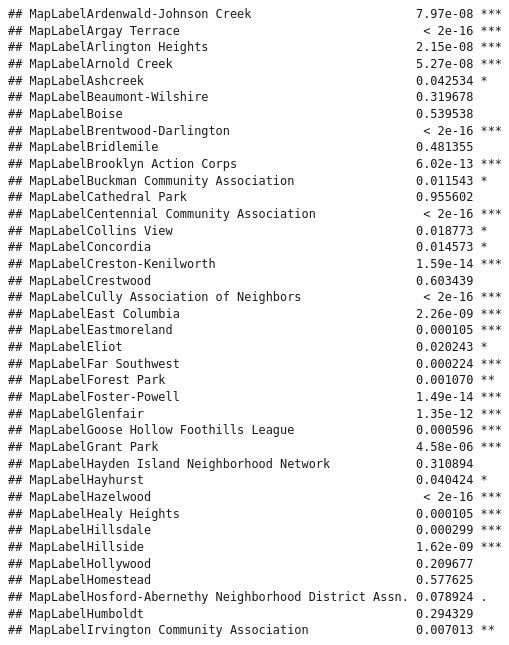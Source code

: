 \documentclass[]{article}
\begin{document}
\begin{verbatim}
## MapLabelArdenwald-Johnson Creek                       7.97e-08 ***
## MapLabelArgay Terrace                                  < 2e-16 ***
## MapLabelArlington Heights                             2.15e-08 ***
## MapLabelArnold Creek                                  5.27e-08 ***
## MapLabelAshcreek                                      0.042534 *  
## MapLabelBeaumont-Wilshire                             0.319678    
## MapLabelBoise                                         0.539538    
## MapLabelBrentwood-Darlington                           < 2e-16 ***
## MapLabelBridlemile                                    0.481355    
## MapLabelBrooklyn Action Corps                         6.02e-13 ***
## MapLabelBuckman Community Association                 0.011543 *  
## MapLabelCathedral Park                                0.955602    
## MapLabelCentennial Community Association               < 2e-16 ***
## MapLabelCollins View                                  0.018773 *  
## MapLabelConcordia                                     0.014573 *  
## MapLabelCreston-Kenilworth                            1.59e-14 ***
## MapLabelCrestwood                                     0.603439    
## MapLabelCully Association of Neighbors                 < 2e-16 ***
## MapLabelEast Columbia                                 2.26e-09 ***
## MapLabelEastmoreland                                  0.000105 ***
## MapLabelEliot                                         0.020243 *  
## MapLabelFar Southwest                                 0.000224 ***
## MapLabelForest Park                                   0.001070 ** 
## MapLabelFoster-Powell                                 1.49e-14 ***
## MapLabelGlenfair                                      1.35e-12 ***
## MapLabelGoose Hollow Foothills League                 0.000596 ***
## MapLabelGrant Park                                    4.58e-06 ***
## MapLabelHayden Island Neighborhood Network            0.310894    
## MapLabelHayhurst                                      0.040424 *  
## MapLabelHazelwood                                      < 2e-16 ***
## MapLabelHealy Heights                                 0.000105 ***
## MapLabelHillsdale                                     0.000299 ***
## MapLabelHillside                                      1.62e-09 ***
## MapLabelHollywood                                     0.209677    
## MapLabelHomestead                                     0.577625    
## MapLabelHosford-Abernethy Neighborhood District Assn. 0.078924 .  
## MapLabelHumboldt                                      0.294329    
## MapLabelIrvington Community Association               0.007013 ** 

\end{verbatim}
\end{document}
